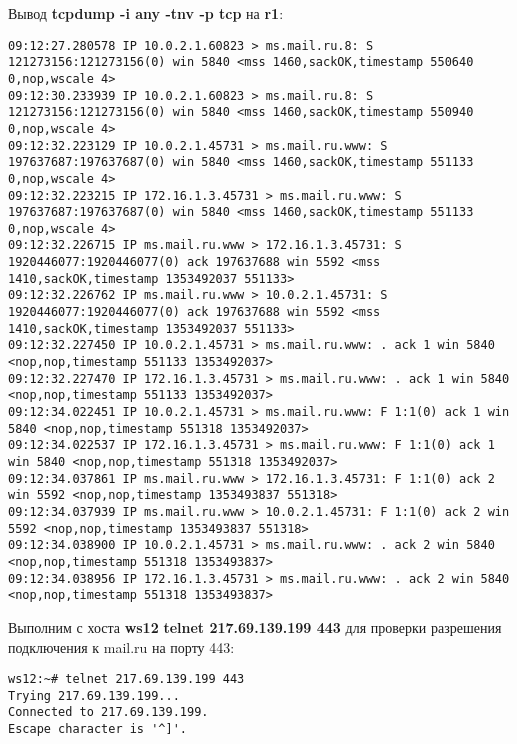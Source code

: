 \documentclass[a4paper,12pt]{article}
\begin{document}
Вывод \textbf{tcpdump -i any -tnv -p tcp} на \textbf{r1}:
\begin{Verbatim}
09:12:27.280578 IP 10.0.2.1.60823 > ms.mail.ru.8: S 121273156:121273156(0) win 5840 <mss 1460,sackOK,timestamp 550640 0,nop,wscale 4>
09:12:30.233939 IP 10.0.2.1.60823 > ms.mail.ru.8: S 121273156:121273156(0) win 5840 <mss 1460,sackOK,timestamp 550940 0,nop,wscale 4>
09:12:32.223129 IP 10.0.2.1.45731 > ms.mail.ru.www: S 197637687:197637687(0) win 5840 <mss 1460,sackOK,timestamp 551133 0,nop,wscale 4>
09:12:32.223215 IP 172.16.1.3.45731 > ms.mail.ru.www: S 197637687:197637687(0) win 5840 <mss 1460,sackOK,timestamp 551133 0,nop,wscale 4>
09:12:32.226715 IP ms.mail.ru.www > 172.16.1.3.45731: S 1920446077:1920446077(0) ack 197637688 win 5592 <mss 1410,sackOK,timestamp 1353492037 551133>
09:12:32.226762 IP ms.mail.ru.www > 10.0.2.1.45731: S 1920446077:1920446077(0) ack 197637688 win 5592 <mss 1410,sackOK,timestamp 1353492037 551133>
09:12:32.227450 IP 10.0.2.1.45731 > ms.mail.ru.www: . ack 1 win 5840 <nop,nop,timestamp 551133 1353492037>
09:12:32.227470 IP 172.16.1.3.45731 > ms.mail.ru.www: . ack 1 win 5840 <nop,nop,timestamp 551133 1353492037>
09:12:34.022451 IP 10.0.2.1.45731 > ms.mail.ru.www: F 1:1(0) ack 1 win 5840 <nop,nop,timestamp 551318 1353492037>
09:12:34.022537 IP 172.16.1.3.45731 > ms.mail.ru.www: F 1:1(0) ack 1 win 5840 <nop,nop,timestamp 551318 1353492037>
09:12:34.037861 IP ms.mail.ru.www > 172.16.1.3.45731: F 1:1(0) ack 2 win 5592 <nop,nop,timestamp 1353493837 551318>
09:12:34.037939 IP ms.mail.ru.www > 10.0.2.1.45731: F 1:1(0) ack 2 win 5592 <nop,nop,timestamp 1353493837 551318>
09:12:34.038900 IP 10.0.2.1.45731 > ms.mail.ru.www: . ack 2 win 5840 <nop,nop,timestamp 551318 1353493837>
09:12:34.038956 IP 172.16.1.3.45731 > ms.mail.ru.www: . ack 2 win 5840 <nop,nop,timestamp 551318 1353493837>
\end{Verbatim}

Выполним с хоста \textbf{ws12} \textbf{telnet 217.69.139.199 443} для проверки
разрешения подключения к mail.ru на порту 443:
\begin{Verbatim}
ws12:~# telnet 217.69.139.199 443
Trying 217.69.139.199...
Connected to 217.69.139.199.
Escape character is '^]'.
\end{Verbatim}
\end{document}

